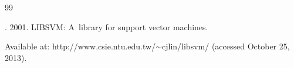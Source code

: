 {{\begin{thebibliography}{99}
 \label{end\stat}




. 2001. LIBSVM: A~library for support vector machines.

Available at: {\sf http://www.csie.ntu.edu.tw/$\sim$cjlin/libsvm/} (accessed October 25, 2013).





 \end{thebibliography}

} }



\renewcommand{\bibname}{\protect\rmfamily Литература}


